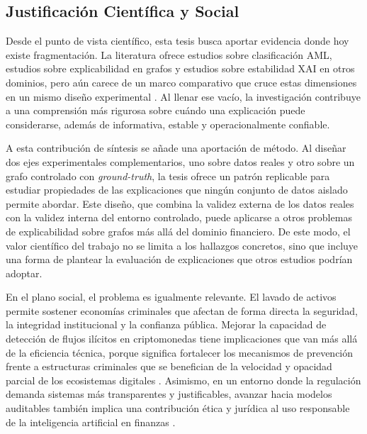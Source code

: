 \bigskip

\subsection{Justificación Científica y Social}

Desde el punto de vista científico, esta tesis busca aportar evidencia donde hoy existe fragmentación. La literatura ofrece estudios sobre clasificación AML, estudios sobre explicabilidad en grafos y estudios sobre estabilidad XAI en otros dominios, pero aún carece de un marco comparativo que cruce estas dimensiones en un mismo diseño experimental \cite{Gawantka2024AExplanations, Rai2025EvaluatingData, Fujiwara2024KnowledgeStability}. Al llenar ese vacío, la investigación contribuye a una comprensión más rigurosa sobre cuándo una explicación puede considerarse, además de informativa, estable y operacionalmente confiable.

A esta contribución de síntesis se añade una aportación de método. Al diseñar dos ejes experimentales complementarios, uno sobre datos reales y otro sobre un grafo controlado con \textit{ground-truth}, la tesis ofrece un patrón replicable para estudiar propiedades de las explicaciones que ningún conjunto de datos aislado permite abordar. Este diseño, que combina la validez externa de los datos reales con la validez interna del entorno controlado, puede aplicarse a otros problemas de explicabilidad sobre grafos más allá del dominio financiero. De este modo, el valor científico del trabajo no se limita a los hallazgos concretos, sino que incluye una forma de plantear la evaluación de explicaciones que otros estudios podrían adoptar.

\bigskip

En el plano social, el problema es igualmente relevante. El lavado de activos permite sostener economías criminales que afectan de forma directa la seguridad, la integridad institucional y la confianza pública. Mejorar la capacidad de detección de flujos ilícitos en criptomonedas tiene implicaciones que van más allá de la eficiencia técnica, porque significa fortalecer los mecanismos de prevención frente a estructuras criminales que se benefician de la velocidad y opacidad parcial de los ecosistemas digitales \cite{Cui2024EG-SAN:Cryptocurrency, Lin2026DetectingLaundering}. Asimismo, en un entorno donde la regulación demanda sistemas más transparentes y justificables, avanzar hacia modelos auditables también implica una contribución ética y jurídica al uso responsable de la inteligencia artificial en finanzas \cite{FATF2012InternationalRecommendations}.

